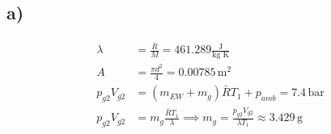 

\subsection*{a)}
\begin{align*}
\lambda &= \frac{\bar{R}}{M} = 461.289 \frac{\text{J}}{\text{kg K}} \\
A &= \frac{\pi d^2}{4} = 0.00785 \, \text{m}^2 \\
p_{g2} V_{g2} &= (m_{EW} + m_g) \bar{R} T_1 + p_{amb} = 7.4 \, \text{bar} \\
p_{g2} V_{g2} &= m_g \frac{\bar{R} T_1}{\lambda} \implies m_g = \frac{p_{g2} V_{g2}}{\lambda T_1} \approx 3.429 \, \text{g}
\end{align*}